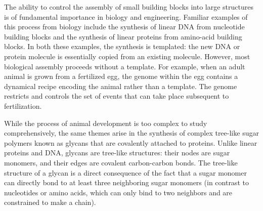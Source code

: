 The ability to control the assembly of small building blocks into large structures is of fundamental importance in biology and engineering. Familiar examples of this process from biology include the synthesis of linear DNA from nucleotide building blocks and the synthesis of linear proteins from amino-acid building blocks. In both these examples, the synthesis is templated: the new DNA or protein molecule is essentially copied from an existing molecule. However, most biological assembly proceeds without a template. For example, when an adult animal is grown from a fertilized egg, the genome within the egg contains a dynamical recipe encoding the animal rather than a template. The genome restricts and controls the set of events that can take place subsequent to fertilization.

While the process of animal development is too complex to study comprehensively, the same themes arise in the synthesis of complex tree-like sugar polymers known as glycans \cite{Varki2017} that are covalently attached to proteins. Unlike linear proteins and DNA, glycans are tree-like structures: their nodes are sugar monomers, and their edges are covalent carbon-carbon bonds. The tree-like structure of a glycan is a direct consequence of the fact that a sugar monomer can directly bond to at least three neighboring sugar monomers (in contrast to nucleotides or amino acids, which can only bind to two neighbors and are constrained to make a chain).

